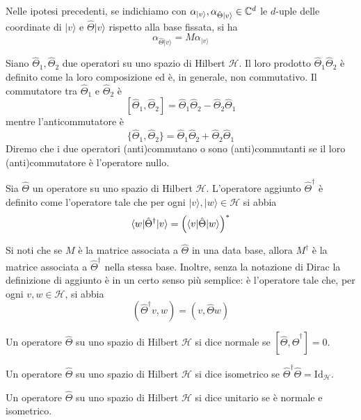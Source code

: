 \documentclass[a4paper, 11pt]{article}
\renewcommand{\H}{\mathcal{H}}
\newcommand{\id}{\mathrm{Id}}
\renewcommand{\ket}[1]{| #1\rangle}
\begin{document}
	\begin{lemma}
		Nelle ipotesi precedenti, se indichiamo con $\alpha_{\ket{v}},\alpha_{\hat{\Theta}\ket{v}}\in \C ^d$ le $d$-uple delle coordinate di $\ket{v
		}$ e $\hat{\Theta} \ket {v}$ rispetto alla base fissata, si ha
		\[\alpha_{\hat{\Theta}\ket{v}}=M\alpha_{\ket{v}}\] 
	\end{lemma}
	\begin{definition}
		Siano $\hat{\Theta}_1,\hat{\Theta}_2$ due operatori su uno spazio di Hilbert $\H$. Il loro prodotto $\hat{\Theta}_1\hat{\Theta}_2$ è definito come la loro composizione ed è, in generale, non commutativo. Il commutatore tra $\hat{\Theta}_1$ e $\hat{\Theta}_2$ è
		\[[\hat{\Theta}_1,\hat{\Theta}_2]=\hat{\Theta}_1\hat{\Theta}_2-\hat{\Theta}_2\hat{\Theta}_1\]
		mentre l'anticommutatore è
		\[\{\hat{\Theta}_1,\hat{\Theta}_2\}=\hat{\Theta}_1\hat{\Theta}_2+\hat{\Theta}_2\hat{\Theta}_1\]
		Diremo che i due operatori (anti)commutano o sono (anti)commutanti se il loro (anti)commutatore è l'operatore nullo.
	\end{definition}
	\begin{definition}
		Sia $\hat{\Theta}$ un operatore su uno spazio di Hilbert $\H$. L'operatore aggiunto $\hat{\Theta}^\dagger$ è definito come l'operatore tale che per ogni $\ket{v},\ket{w}\in\H$ si abbia
		\[\langle w|\hat{\Theta}^\dagger|v\rangle=\left(\langle v|\hat{\Theta}|w\rangle\right)^*\]
	\end{definition}
	Si noti che se $M$ è la matrice associata a $\hat{\Theta}$ in una data base, allora $M^\dagger$ è la matrice associata a $\hat{\Theta}^\dagger$ nella stessa base. Inoltre, senza la notazione di Dirac la definizione di aggiunto è in un certo senso più semplice: è l'operatore tale che, per ogni $v,w\in \H$, si abbia
	\[(\hat{\Theta}^\dagger v,w)=(v,\hat{\Theta}w)\]
	\begin{definition}
		Un operatore $\hat{\Theta}$ su uno spazio di Hilbert $\H$ si dice normale se $[\hat{\Theta},\hat{\Theta}^\dagger]=0$.		
	\end{definition}
		\begin{definition}
		Un operatore $\hat{\Theta}$ su uno spazio di Hilbert $\H$ si dice isometrico se $\hat{\Theta}^\dagger\hat{\Theta}=\id_\H$.		
	\end{definition}
	\begin{definition}
	Un operatore $\hat{\Theta}$ su uno spazio di Hilbert $\H$ si dice unitario se è normale e isometrico.		
\end{definition}
\end{document}
